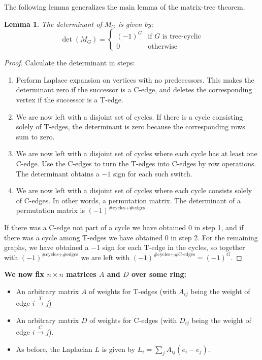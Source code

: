 \documentclass[a4paper, 11pt]{article}
\newtheorem{lemma}[theorem]{Lemma}
\theoremstyle{definition}
\begin{document}
The following lemma generalizes the main lemma of the matrix-tree theorem.

\begin{lemma}
  The determinant of $M_G$ is given by:
  \[
    \det(M_G) = \begin{cases}
      (-1)^G & \text{if $G$ is tree-cyclic} \\
      0 & \text{otherwise}
    \end{cases}
  \]
\end{lemma}

\begin{proof}
  Calculate the determinant in steps:
  \begin{enumerate}
    \item Perform Laplace expansion on vertices with no predecessors. This makes the determinant zero if the successor is a C-edge, and deletes the corresponding vertex if the successor is a T-edge.
    \item We are now left with a disjoint set of cycles. If there is a cycle consisting solely of T-edges, the determinant is zero because the corresponding rows sum to zero.
    \item We are now left with a disjoint set of cycles where each cycle has at least one C-edge. Use the C-edges to turn the T-edges into C-edges by row operations. The determinant obtains a $-1$ sign for each such switch.
    \item We are now left with a disjoint set of cycles where each cycle consists solely of C-edges. In other words, a permutation matrix. The determinant of a permutation matrix is $(-1)^{\text{\#cycles} + \text{\#edges}}$
  \end{enumerate}
  If there was a C-edge not part of a cycle we have obtained $0$ in step 1, and if there was a cycle among T-edges we have obtained $0$ in step 2. For the remaining graphs, we have obtained a $-1$ sign for each T-edge in the cycles, so together with $(-1)^{\text{\#cycles} + \text{\#edges}}$ we are left with $(-1)^{\text{\#cycles} + \text{\#C-edges}} = (-1)^G$.
\end{proof}

\textbf{We now fix $n\times n$ matrices $A$ and $D$ over some ring:}

\begin{itemize}
  \item An arbitrary matrix $A$ of weights for T-edges (with $A_{ij}$ being the weight of edge $i \xrightarrow{T} j$)
  \item An arbitrary matrix $D$ of weights for C-edges (with $D_{ij}$ being the weight of edge $i \xrightarrow{C} j$).
  \item As before, the Laplacian $L$ is given by $L_i = \sum_j A_{ij}(e_i - e_j)$.
\end{itemize}
\end{document}
